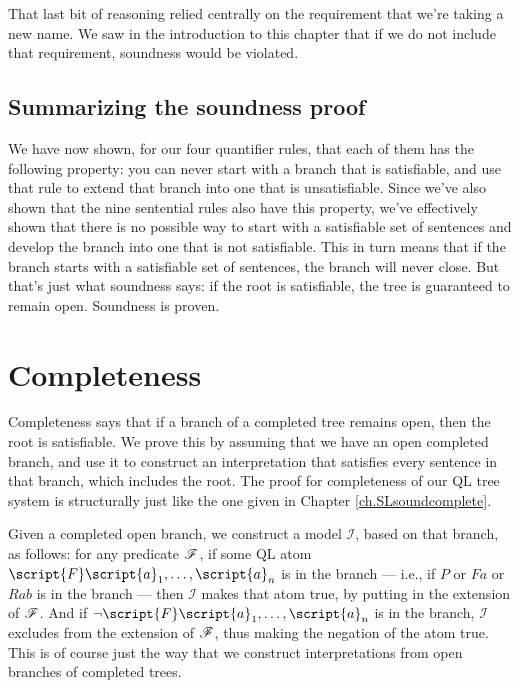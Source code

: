That last bit of reasoning relied centrally on the requirement that we're taking a new name. We saw in the introduction to this chapter that if we do not include that requirement, soundness would be violated.

\subsection{Summarizing the soundness proof}

We have now shown, for our four quantifier rules, that each of them has the following property: you can never start with a branch that is satisfiable, and use that rule to extend that branch into one that is unsatisfiable. Since we've also shown that the nine sentential rules also have this property, we've effectively shown that there is no possible way to start with a satisfiable set of sentences and develop the branch into one that is not satisfiable. This in turn means that if the branch starts with a satisfiable set of sentences, the branch will never close. But that's just what soundness says: if the root is satisfiable, the tree is guaranteed to remain open. Soundness is proven.


\section{Completeness}

Completeness says that if a branch of a completed tree remains open, then the root is satisfiable. We prove this by assuming that we have an open completed branch, and use it to construct an interpretation that satisfies every sentence in that branch, which includes the root. The proof for completeness of our QL tree system is structurally just like the one given in Chapter \ref{ch.SLsoundcomplete}.

Given a completed open branch, we construct a model $\mathcal{I}$, based on that branch, as follows: for any predicate $\mathscr{F}$\!, if some QL atom $\script{F}\script{a}_{1}, \ldots, \script{a}_{n}$ is in the branch --- i.e., if $P$ or $Fa$ or $Rab$ is in the branch --- then $\mathcal{I}$ makes that atom true, by putting  in the extension of $\mathscr{F}$\!. And if $\enot \script{F}\script{a}_{1}, \ldots, \script{a}_{n}$ is in the branch, $\mathcal{I}$ excludes  from the extension of $\mathscr{F}$\!, thus making the negation of the atom true. This is of course just the way that we construct interpretations from open branches of completed trees.


